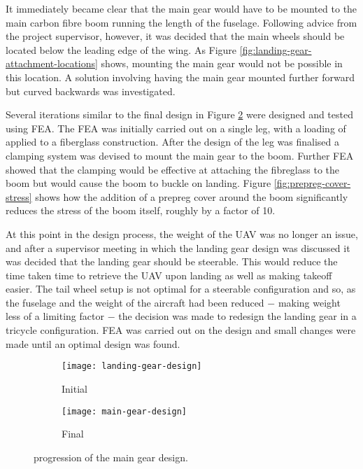 \documentclass[../../main.tex]{subfiles}
\begin{document}
It immediately became clear that the main gear would have to be mounted to the main carbon fibre boom running the length of the fuselage.
Following advice from the project supervisor, however, it was decided that the main wheels should be located below the leading edge of the wing.
As Figure \ref{fig:landing-gear-attachment-locations} shows, mounting the main gear would not be possible in this location.
A solution involving having the main gear mounted further forward but curved backwards was investigated.  

Several iterations similar to the final design in Figure \ref{fig:main-gear-progression:final} were designed and tested using FEA.
The FEA was initially carried out on a single leg, with a loading of  applied to a fiberglass construction.
After the design of the leg was finalised a clamping system was devised to mount the main gear to the boom.
Further FEA showed that the clamping would be effective at attaching the fibreglass to the boom but would cause the boom to buckle on landing.
Figure \ref{fig:prepreg-cover-stress} shows how the addition of a prepreg cover around the boom significantly reduces the stress of the boom itself, roughly by a factor of 10. 


At this point in the design process, the weight of the UAV was no longer an issue, and after a supervisor meeting in which the landing gear design was discussed it was decided that the landing gear should be steerable.
This would reduce the time taken time to retrieve the UAV upon landing as well as making takeoff easier.
The tail wheel setup is not optimal for a steerable configuration and so, as the fuselage and the weight of the aircraft had been reduced $-$ making weight less of a limiting factor $-$ the decision was made to redesign the landing gear in a tricycle configuration. 
FEA was carried out on the design and small changes were made until an optimal design was found.

\begin{figure}[H]
    \centering
    \begin{subfigure}[b]{0.33\columnwidth}
        \centering
        \texttt{[image: landing-gear-design]}
        \caption{Initial}
        \label{fig:main-gear-progression:initial}
    \end{subfigure}
    \hfill
    \begin{subfigure}[b]{0.49\columnwidth}
        \centering
        \texttt{[image: main-gear-design]}
        \caption{Final}
        \label{fig:main-gear-progression:final}
    \end{subfigure}
    
    \caption{progression of the main gear design.}
    \label{fig:main-gear-progression}
\end{figure}
\end{document}
